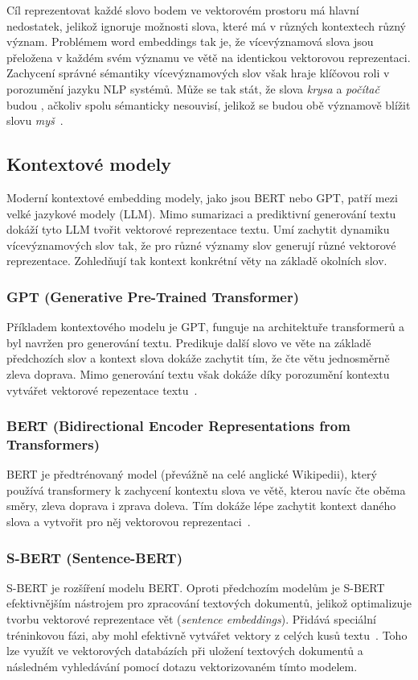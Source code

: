 Cíl reprezentovat každé slovo bodem ve vektorovém prostoru má hlavní nedostatek, jelikož ignoruje možnosti slova, které má v různých kontextech různý význam. Problémem word embeddings tak je, že vícevýznamová slova jsou přeložena v každém svém významu ve větě na identickou vektorovou reprezentaci. Zachycení správné sémantiky vícevýznamových slov však hraje klíčovou roli v porozumění jazyku NLP systémů. Může se tak stát, že slova \textit{krysa} a \textit{počítač} budou , ačkoliv spolu sémanticky nesouvisí, jelikož se budou obě významově blížit slovu \textit{myš}~\cite{from_word_to_sense}.

\subsection{Kontextové modely}
Moderní kontextové embedding modely, jako jsou BERT nebo GPT, patří mezi velké jazykové modely (LLM). Mimo sumarizaci a prediktivní generování textu dokáží tyto LLM tvořit vektorové reprezentace textu. Umí zachytit dynamiku vícevýznamových slov tak, že pro různé významy slov generují různé vektorové reprezentace. Zohledňují tak kontext konkrétní věty na základě okolních slov.

\subsubsection{GPT (Generative Pre-Trained Transformer)}
Příkladem kontextového modelu je GPT, funguje na architektuře transformerů a byl navržen pro generování textu. Predikuje další slovo ve věte na základě předchozích slov a kontext slova dokáže zachytit tím, že čte větu jednosměrně zleva doprava. Mimo generování textu však dokáže díky porozumění kontextu vytvářet vektorové repezentace textu~\cite{gpt}.

\subsubsection{BERT (Bidirectional Encoder Representations from Transformers)}
BERT je předtrénovaný model (převážně na celé anglické Wikipedii), který používá transformery k zachycení kontextu slova ve větě, kterou navíc čte oběma směry, zleva doprava i zprava doleva. Tím dokáže lépe zachytit kontext daného slova a vytvořit pro něj vektorovou reprezentaci~\cite{bert}.

\subsubsection{S-BERT (Sentence-BERT)}
S-BERT je rozšíření modelu BERT. Oproti předchozím modelům je S-BERT efektivnějším nástrojem pro zpracování textových dokumentů, jelikož optimalizuje tvorbu vektorové reprezentace vět (\textit{sentence embeddings}). Přidává speciální tréninkovou fázi, aby mohl efektivně vytvářet vektory z celých kusů textu~\cite{sbert}. Toho lze využít ve vektorových databázích při uložení textových dokumentů a následném vyhledávání pomocí dotazu vektorizovaném tímto modelem.

